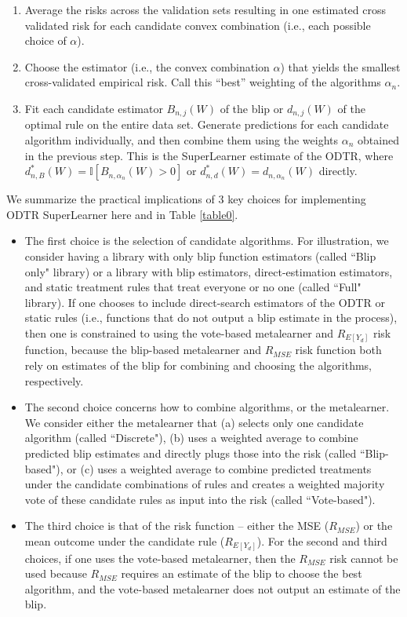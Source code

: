 \documentclass[a4paper,12pt]{article}
\begin{document}
\begin{enumerate}
\item Average the risks across the validation sets resulting in one estimated cross validated risk for each candidate convex combination (i.e., each possible choice of $\alpha$).
\item Choose the estimator (i.e., the convex combination $\alpha$) that yields the smallest cross-validated empirical risk. Call this “best” weighting of the algorithms $\alpha_n$.
\item Fit each candidate estimator $B_{n,j}(W)$ of the blip or $d_{n,j}(W)$ of the optimal rule on the entire data set. Generate predictions for each candidate algorithm individually, and then combine them using the weights $\alpha_n$ obtained in the previous step. This is the SuperLearner estimate of the ODTR, where $d_{n,B}^*(W)= \mathbb{I}[B_{n,\alpha_n}(W)>0]$ or $d_{n,d}^*(W)=d_{n,\alpha_n}(W)$ directly.
\end{enumerate}



We summarize the practical implications of 3 key choices for implementing ODTR SuperLearner here and in Table \ref{table0}.

\begin{itemize}
    \item The first choice is the selection of candidate algorithms. For illustration, we consider having a library with only blip function estimators (called ``Blip only" library) or a library with blip estimators, direct-estimation estimators, and static treatment rules that treat everyone or no one (called ``Full" library). If one chooses to include direct-search estimators of the ODTR or static rules (i.e., functions that do not output a blip estimate in the process), then one is constrained to using the vote-based metalearner and $R_{E[Y_d]}$ risk function, because the blip-based metalearner and $R_{MSE}$ risk function both rely on estimates of the blip for combining and choosing the algorithms, respectively. 
    \item The second choice concerns how to combine algorithms, or the metalearner. We consider either the metalearner that (a) selects only one candidate algorithm (called ``Discrete"), (b) uses a weighted average to combine predicted blip estimates and directly plugs those into the risk (called ``Blip-based"), or (c) uses a weighted average to combine predicted treatments under the candidate combinations of rules and creates a weighted majority vote of these candidate rules as input into the risk (called ``Vote-based").
    \item The third choice is that of the risk function -- either the MSE ($R_{MSE}$) or the mean outcome under the candidate rule ($R_{E[Y_d]}$). For the second and third choices, if one uses the vote-based metalearner, then the $R_{MSE}$ risk cannot be used because $R_{MSE}$ requires an estimate of the blip to choose the best algorithm, and the vote-based metalearner does not output an estimate of the blip.
\end{itemize}   
\end{document}
